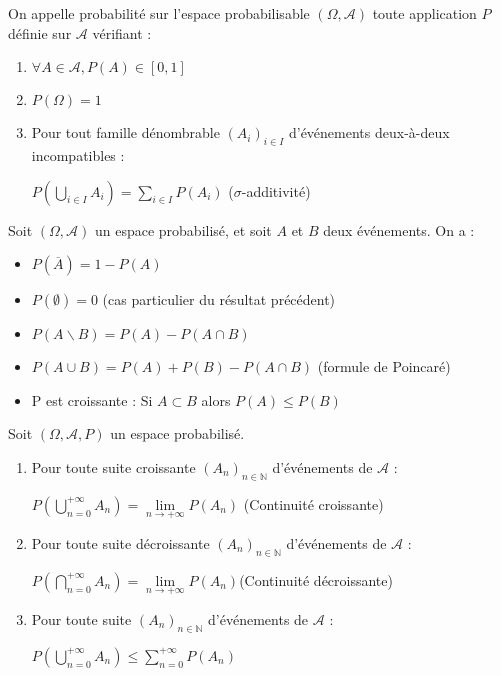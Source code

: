 \documentclass[a4paper,12pt]{book}
\newcommand{\Def}[2]{\begin{tcolorbox}[colback=white,colframe=red!10!green!20!blue!75!, title=Définition : #1]#2\end{tcolorbox}}
\newcommand{\Thr}[2]{\begin{tcolorbox}[sharp corners, colback=white,colframe=red!10!blue!30!green!75!, title=Théorème : #1]#2\end{tcolorbox}}
\def\N{\mathbb{N}}
\begin{document}
\Def{}{On appelle probabilité sur l'espace probabilisable $(\Omega,\mathcal{A})$ toute application $P$ définie sur $\mathcal{A}$ vérifiant :\begin{enumerate}
\item $\forall A\in\mathcal{A}, P(A)\in [0,1]$
\item $P(\Omega)=1$
\item Pour tout famille dénombrable $(A_i)_{i\in I}$ d'événements deux-à-deux incompatibles : \par\begin{center}$P\left(\bigcup_{i\in I}A_i\right)=\sum\limits_{i\in I}P(A_i)$ ($\sigma$-additivité)\end{center}
\end{enumerate}}
\Thr{}{Soit $(\Omega,\mathcal{A})$ un espace probabilisé, et soit $A$ et $B$ deux événements. On a :\begin{itemize}
\item $P(\overline{A})=1-P(A)$
\item $P(\emptyset)=0$ (cas particulier du résultat précédent)
\item $P(A\backslash B)=P(A)-P(A\cap B)$
\item $P(A\cup B)=P(A)+P(B)-P(A\cap B)$ (formule de Poincaré)
\item P est croissante : Si $A\subset B$ alors $P(A)\leq P(B)$
\end{itemize}}
\Thr{}{Soit $(\Omega, \mathcal{A},P)$ un espace probabilisé.\begin{enumerate}
\item Pour toute suite croissante $(A_n)_{n\in\N}$ d'événements de $\mathcal{A}$ : \par\begin{center}$P\left(\bigcup_{n=0}^{+\infty}A_n\right)=\lim\limits_{n\to+\infty}P(A_n)$ (Continuité croissante)\end{center}
\item Pour toute suite décroissante $(A_n)_{n\in\N}$ d'événements de $\mathcal{A}$ : \par\begin{center}$P\left(\bigcap_{n=0}^{+\infty}A_n\right)=\lim\limits_{n\to+\infty}P(A_n)$(Continuité décroissante)\end{center}
\item Pour toute suite $(A_n)_{n\in\N}$ d'événements de $\mathcal{A}$ :\par\begin{center}$P\left(\bigcup_{n=0}^{+\infty}A_n\right)\leq\sum\limits_{n=0}^{+\infty}P(A_n)$\end{center}
\end{enumerate}}
\end{document}
